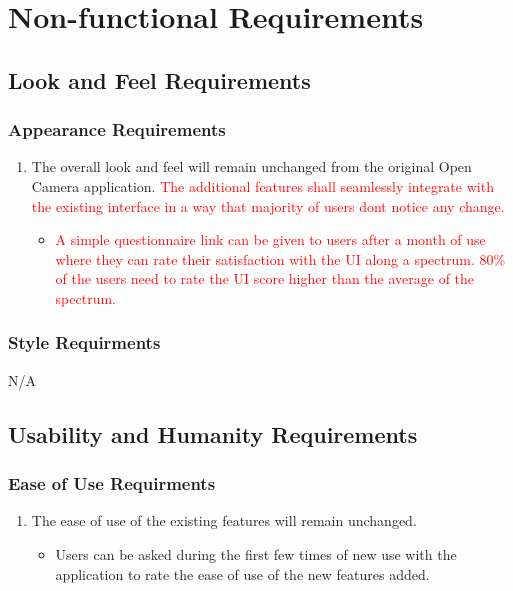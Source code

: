 \documentclass[12pt, titlepage]{article}
\begin{document}
\section{Non-functional Requirements}



\subsection{Look and Feel Requirements}
\subsubsection{Appearance Requirements}
\begin{enumerate}[{ARL}1.]
	\item The overall look and feel will remain unchanged from the original Open Camera application. \textcolor{red}{The additional features shall seamlessly integrate with the existing interface in a way that majority of users dont notice any change.}
	\begin{itemize}
		\item \textcolor{red}{A simple questionnaire link can be given to users after a month of use where they can rate their satisfaction with the UI along a spectrum. 80\% of the users need to rate the UI score higher than the average of the spectrum. }
	\end{itemize}
\end{enumerate}

\subsubsection {Style Requirments}
{\color{red}N/A}

\subsection{Usability and Humanity Requirements}
\subsubsection{Ease of Use Requirments}
\begin{enumerate}[{EU}1. ]
	\item The ease of use of the existing features will remain unchanged. 
	\begin{itemize}
		\item {\color{red} Users can be asked during the first few times of new use with the application to rate the ease of use of the new features added. }
	\end{itemize}
\end{enumerate}
\end{document}
